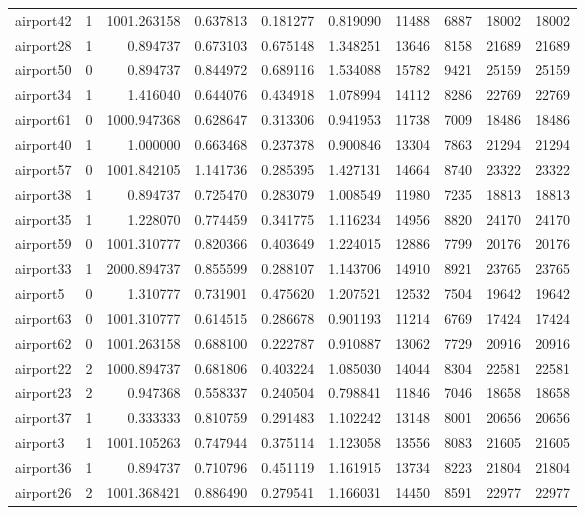 \begin{longtable}{|l|r|r|r|r|r|r|r|r|r|}
airport42 & 1 & 1001.263158 & 0.637813 & 0.181277 & 0.819090 & 11488 & 6887 & 18002 & 18002 \\
airport28 & 1 & 0.894737 & 0.673103 & 0.675148 & 1.348251 & 13646 & 8158 & 21689 & 21689 \\
airport50 & 0 & 0.894737 & 0.844972 & 0.689116 & 1.534088 & 15782 & 9421 & 25159 & 25159 \\
airport34 & 1 & 1.416040 & 0.644076 & 0.434918 & 1.078994 & 14112 & 8286 & 22769 & 22769 \\
airport61 & 0 & 1000.947368 & 0.628647 & 0.313306 & 0.941953 & 11738 & 7009 & 18486 & 18486 \\
airport40 & 1 & 1.000000 & 0.663468 & 0.237378 & 0.900846 & 13304 & 7863 & 21294 & 21294 \\
airport57 & 0 & 1001.842105 & 1.141736 & 0.285395 & 1.427131 & 14664 & 8740 & 23322 & 23322 \\
airport38 & 1 & 0.894737 & 0.725470 & 0.283079 & 1.008549 & 11980 & 7235 & 18813 & 18813 \\
airport35 & 1 & 1.228070 & 0.774459 & 0.341775 & 1.116234 & 14956 & 8820 & 24170 & 24170 \\
airport59 & 0 & 1001.310777 & 0.820366 & 0.403649 & 1.224015 & 12886 & 7799 & 20176 & 20176 \\
airport33 & 1 & 2000.894737 & 0.855599 & 0.288107 & 1.143706 & 14910 & 8921 & 23765 & 23765 \\
airport5 & 0 & 1.310777 & 0.731901 & 0.475620 & 1.207521 & 12532 & 7504 & 19642 & 19642 \\
airport63 & 0 & 1001.310777 & 0.614515 & 0.286678 & 0.901193 & 11214 & 6769 & 17424 & 17424 \\
airport62 & 0 & 1001.263158 & 0.688100 & 0.222787 & 0.910887 & 13062 & 7729 & 20916 & 20916 \\
airport22 & 2 & 1000.894737 & 0.681806 & 0.403224 & 1.085030 & 14044 & 8304 & 22581 & 22581 \\
airport23 & 2 & 0.947368 & 0.558337 & 0.240504 & 0.798841 & 11846 & 7046 & 18658 & 18658 \\
airport37 & 1 & 0.333333 & 0.810759 & 0.291483 & 1.102242 & 13148 & 8001 & 20656 & 20656 \\
airport3 & 1 & 1001.105263 & 0.747944 & 0.375114 & 1.123058 & 13556 & 8083 & 21605 & 21605 \\
airport36 & 1 & 0.894737 & 0.710796 & 0.451119 & 1.161915 & 13734 & 8223 & 21804 & 21804 \\
airport26 & 2 & 1001.368421 & 0.886490 & 0.279541 & 1.166031 & 14450 & 8591 & 22977 & 22977 \\

\end{longtable}
